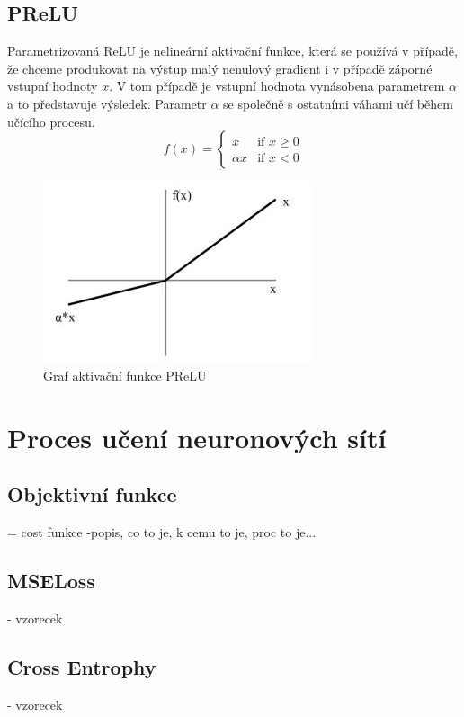 \subsection*{PReLU}
Parametrizovaná ReLU je nelineární aktivační funkce, která se používá v případě, že chceme produkovat na výstup malý nenulový gradient i v případě záporné vstupní hodnoty $x$. V tom případě je vstupní hodnota vynásobena parametrem $\alpha$ a to představuje výsledek. Parametr $\alpha$ se společně s ostatními váhami učí během učícího procesu.
\begin{equation}
  f(x) =
  \begin{cases}
    x & \text{if } x \geq 0 \\
    {\alpha}x & \text{if } x < 0
  \end{cases}
\end{equation}
\begin{figure}[H]
    \centering
    \includegraphics[scale=1]{obrazky-figures/prelu.jpg}
    \caption{\label{fig:prelu}Graf aktivační funkce PReLU}
\end{figure}



\section{Proces učení neuronových sítí}

\subsection{Objektivní funkce}
= cost funkce
-popis, co to je, k cemu to je, proc to je...

\subsection*{MSELoss}
- vzorecek
\subsection*{Cross Entrophy}
- vzorecek

